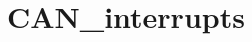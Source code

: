\hypertarget{group___c_a_n__interrupts}{\section{C\-A\-N\-\_\-interrupts}
\label{group___c_a_n__interrupts}
}
